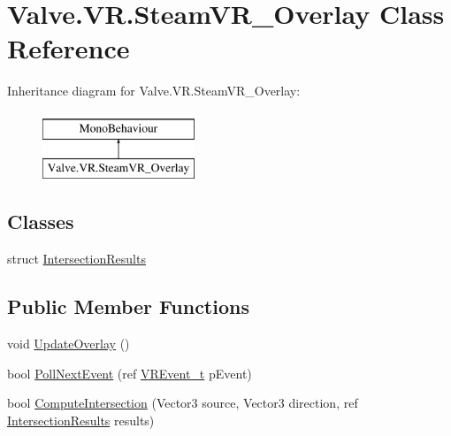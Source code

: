 \hypertarget{class_valve_1_1_v_r_1_1_steam_v_r___overlay}{}\section{Valve.\+V\+R.\+Steam\+V\+R\+\_\+\+Overlay Class Reference}
\label{class_valve_1_1_v_r_1_1_steam_v_r___overlay}
Inheritance diagram for Valve.\+V\+R.\+Steam\+V\+R\+\_\+\+Overlay\+:\begin{figure}[H]
\begin{center}
\leavevmode
\includegraphics[height=2.000000cm]{class_valve_1_1_v_r_1_1_steam_v_r___overlay}
\end{center}
\end{figure}
\subsection*{Classes}
\begin{DoxyCompactItemize}
\item 
struct \mbox{\hyperlink{struct_valve_1_1_v_r_1_1_steam_v_r___overlay_1_1_intersection_results}{Intersection\+Results}}
\end{DoxyCompactItemize}
\subsection*{Public Member Functions}
\begin{DoxyCompactItemize}
\item 
void \mbox{\hyperlink{class_valve_1_1_v_r_1_1_steam_v_r___overlay_a5d158d89f29b8460a23252ae76957ef1}{Update\+Overlay}} ()
\item 
bool \mbox{\hyperlink{class_valve_1_1_v_r_1_1_steam_v_r___overlay_a97096097093d8d96de7444a0fb1e7627}{Poll\+Next\+Event}} (ref \mbox{\hyperlink{struct_valve_1_1_v_r_1_1_v_r_event__t}{V\+R\+Event\+\_\+t}} p\+Event)
\item 
bool \mbox{\hyperlink{class_valve_1_1_v_r_1_1_steam_v_r___overlay_a4df3ccd3cf4e377f2e921100c78d5f8e}{Compute\+Intersection}} (Vector3 source, Vector3 direction, ref \mbox{\hyperlink{struct_valve_1_1_v_r_1_1_steam_v_r___overlay_1_1_intersection_results}{Intersection\+Results}} results)
\end{DoxyCompactItemize}
